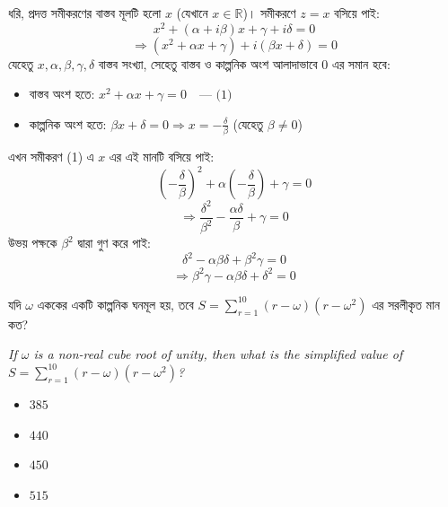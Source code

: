 \documentclass[12pt, a4paper]{article}
\begin{document}
\begin{tcolorbox}[solutionbox={সমাধান (Solution)}]
    \noindent
    ধরি, প্রদত্ত সমীকরণের বাস্তব মূলটি হলো $x$ (যেখানে $x \in \mathbb{R}$)। সমীকরণে $z = x$ বসিয়ে পাই:
    \[ x^2 + (\alpha + i\beta)x + \gamma + i\delta = 0 \]
    \[ \Rightarrow (x^2 + \alpha x + \gamma) + i(\beta x + \delta) = 0 \]
    যেহেতু $x, \alpha, \beta, \gamma, \delta$ বাস্তব সংখ্যা, সেহেতু বাস্তব ও কাল্পনিক অংশ আলাদাভাবে $0$ এর সমান হবে:
    \begin{itemize}[itemsep=0.3em]
        \item বাস্তব অংশ হতে: $x^2 + \alpha x + \gamma = 0 \quad \text{--- (1)}$
        \item কাল্পনিক অংশ হতে: $\beta x + \delta = 0 \Rightarrow x = -\frac{\delta}{\beta}$ (যেহেতু $\beta \neq 0$)
    \end{itemize}
    
    \vspace{0.5em}
    এখন সমীকরণ (1) এ $x$ এর এই মানটি বসিয়ে পাই:
    \[ \left(-\frac{\delta}{\beta}\right)^2 + \alpha\left(-\frac{\delta}{\beta}\right) + \gamma = 0 \]
    \[ \Rightarrow \frac{\delta^2}{\beta^2} - \frac{\alpha\delta}{\beta} + \gamma = 0 \]
    উভয় পক্ষকে $\beta^2$ দ্বারা গুণ করে পাই:
    \[ \delta^2 - \alpha\beta\delta + \beta^2\gamma = 0 \]
    \[ \Rightarrow \beta^2\gamma - \alpha\beta\delta + \delta^2 = 0 \]
\end{tcolorbox}

\vspace{1.5em}

\begin{tcolorbox}[questionbox={প্রশ্ন (Question) 14}]
    \noindent
    যদি $\omega$ এককের একটি কাল্পনিক ঘনমূল হয়, তবে $S = \sum_{r=1}^{10} (r - \omega)(r - \omega^2)$ এর সরলীকৃত মান কত?
    
    \vspace{0.8em}
    \begin{english}
    \noindent\textit{\color{darkgray}
    If $\omega$ is a non-real cube root of unity, then what is the simplified value of $S = \sum_{r=1}^{10} (r - \omega)(r - \omega^2)$?
    }
    \end{english}
\end{tcolorbox}

\begin{itemize}[label={}, leftmargin=1cm, itemsep=0.5em]
    \item[\textbf{A)}] $385$
    \item[\textbf{B)}] $440$
    \item[\textbf{C)}] $450$
    \item[\textbf{D)}] $515$
\end{itemize}
\end{document}
